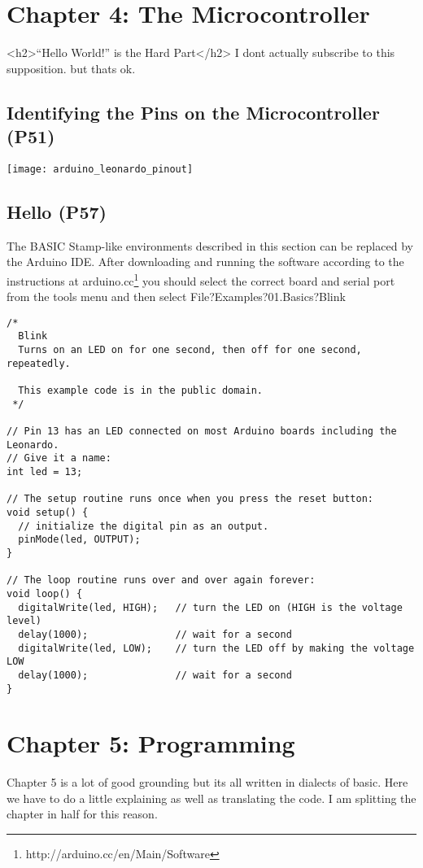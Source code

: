 \documentclass{book}
\begin{document}
\chapter{Chapter 4: The Microcontroller}
<h2>``Hello World!'' is the Hard Part</h2>
I dont actually subscribe to this supposition. but thats ok.

\section{Identifying the Pins on the Microcontroller (P51)}

\texttt{[image: arduino\_leonardo\_pinout]}

\section{Hello (P57)}
The BASIC Stamp-like environments described in this section can be replaced by the Arduino IDE. After downloading and running the software according to the instructions at arduino.cc\footnote{http://arduino.cc/en/Main/Software} you should select the correct board and serial port from the tools menu and then select
File?Examples?01.Basics?Blink

\begin{verbatim}
/*
  Blink
  Turns on an LED on for one second, then off for one second, repeatedly.

  This example code is in the public domain.
 */

// Pin 13 has an LED connected on most Arduino boards including the Leonardo.
// Give it a name:
int led = 13;

// The setup routine runs once when you press the reset button:
void setup() {                
  // initialize the digital pin as an output.
  pinMode(led, OUTPUT);
}

// The loop routine runs over and over again forever:
void loop() {
  digitalWrite(led, HIGH);   // turn the LED on (HIGH is the voltage level)
  delay(1000);               // wait for a second
  digitalWrite(led, LOW);    // turn the LED off by making the voltage LOW
  delay(1000);               // wait for a second
}
\end{verbatim}

\chapter{Chapter 5: Programming}
Chapter 5 is a lot of good grounding but its all written in dialects of basic. Here we have to do a little explaining as well as translating the code. I am splitting the chapter in half for this reason.
\end{document}
